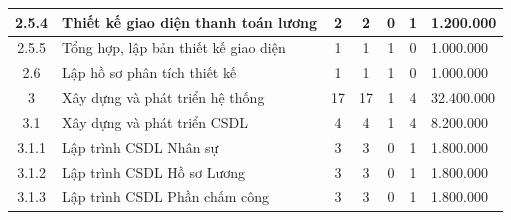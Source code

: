 \begin{longtable}{|c|p{3cm}|c|c|c|c|p{3cm}|}
    2.5.4                           & Thiết kế giao diện thanh toán lương                           & 2                                              & 2                                               & 0                                                               & 1                  & 1.200.000  \\ \hline
    2.5.5                           & Tổng hợp, lập bản thiết kế giao diện                          & 1                                              & 1                                               & 1                                                               & 0                  & 1.000.000  \\ \hline
    2.6                             & Lập hồ sơ phân tích thiết kế                                  & 1                                              & 1                                               & 1                                                               & 0                  & 1.000.000  \\ \hline
    3                               & Xây dựng và phát triển hệ thống                               & 17                                             & 17                                              & 1                                                               & 4                  & 32.400.000 \\ \hline
    3.1                             & Xây dựng và phát triển CSDL                                   & 4                                              & 4                                               & 1                                                               & 4                  & 8.200.000  \\ \hline
    3.1.1                           & Lập trình CSDL Nhân sự                                        & 3                                              & 3                                               & 0                                                               & 1                  & 1.800.000  \\ \hline
    3.1.2                           & Lập trình CSDL Hồ sơ Lương                                    & 3                                              & 3                                               & 0                                                               & 1                  & 1.800.000  \\ \hline
    3.1.3                           & Lập trình CSDL Phần chấm công                                 & 3                                              & 3                                               & 0                                                               & 1                  & 1.800.000  \\ \hline

\end{longtable}
